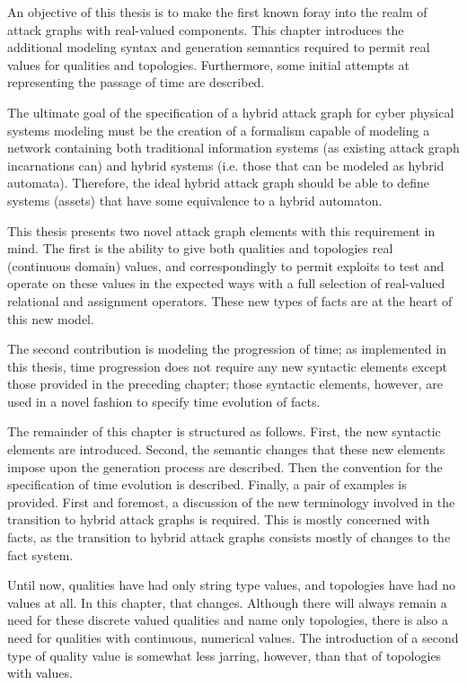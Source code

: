 An objective of this thesis is to make the first known foray into the realm of
attack graphs with real-valued components. This chapter introduces the additional
modeling syntax and generation semantics required to permit real values for
qualities and topologies. Furthermore, some initial attempts at representing
the passage of time are described. 

The ultimate goal of the specification of a hybrid attack graph for cyber
physical systems modeling must be the creation of a formalism capable of
modeling a network containing both traditional information systems (as
existing attack graph incarnations can) and hybrid systems (i.e. those that
can be modeled as hybrid automata). Therefore, the ideal hybrid attack graph
should be able to define systems (assets) that have some equivalence to a
hybrid automaton.

This thesis presents two novel attack graph elements with this requirement
in mind. The first is the ability to give both qualities and topologies
real (continuous domain) values, and correspondingly to permit exploits to
test and operate on these values in the expected ways with a full selection of
real-valued relational and assignment operators. These new types of facts are 
at the heart of this new model. 

The second contribution is modeling the progression
of time; as implemented in this thesis, time progression does not require any
new syntactic elements except those provided in the 
preceding chapter; those syntactic elements, however, are
used in a novel fashion to specify time evolution of facts.

The remainder of this chapter is structured as follows. First, the new
syntactic elements are introduced. Second, the semantic changes that these new
elements impose upon the generation process are described. Then the
convention for the specification of time evolution is described. 
Finally, a pair of examples is provided.
First and foremost, a discussion of the new terminology involved in the
transition to hybrid attack graphs is required. This is mostly concerned with
facts, as the transition to hybrid attack graphs consists mostly of changes
to the fact system.

Until now, qualities have had only string type values, and
topologies have had no values at all. In this chapter, that changes. Although
there will always remain a need for these discrete valued qualities and name
only topologies, there is also a need for qualities with 
continuous, numerical values. The introduction of a second type of quality
value is somewhat less jarring, however, than that of topologies with
values.

